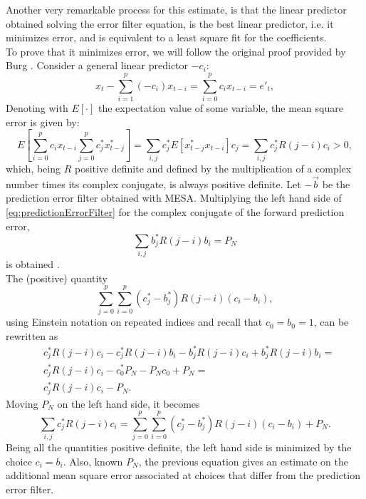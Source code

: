 \documentclass[twocolumn,showpacs,preprintnumbers,nofootinbib,prd,
superscriptaddress,10pt]{revtex4-1}
\begin{document}
Another very remarkable process for this estimate, is that the linear predictor obtained solving the error filter equation, is the best linear predictor, i.e. it minimizes error, and is equivalent to a least square fit for the coefficients. \cite{VDBos}  \\ 
To prove that it minimizes error, we will follow the original proof provided by Burg \cite{burg1975maximum}. Consider a general linear predictor $-c_i$: 
\begin{equation}
    x_{t} - \sum_{i = 1}^p (-c_i)x_{t - i} = \sum_{i = 0}^p c_i x_{t - i} = e'_t, 
\end{equation}
Denoting with $E\left[\cdot\right]$ the expectation value of some variable, the mean square error is given by: 
\begin{equation}
E\left[\sum_{i = 0}^p c_i x_{t-i}\sum_{j = 0}^p c^*_j x^*_{t - j}\right] = \sum_{i,j} c^*_j E\left[x^*_{t-j}x_{t-i} \right] c_j = \sum_{i, j}c^*_j R(j - i) c_i > 0,
\end{equation}
which, being $R$ positive definite and defined by the multiplication of a complex number times its complex conjugate, is always positive definite. 
Let $-\vec{b}$ be the prediction error filter obtained with MESA. Multiplying the left hand side of \ref{eq:predictionErrorFilter} for the complex conjugate of the forward prediction error, 
\begin{equation}\nonumber 
    \sum_{i,j}b^*_jR(j-i)b_i = P_N
\end{equation}
is obtained . \\ 
The (positive) quantity  
\begin{equation}\label{eq:linearPredictor}
    \sum_{j = 0}^p\sum_{i = 0}^p(c^*_j - b^*_j)R(j-i)(c_i - b_i),
\end{equation}
using Einstein notation on repeated indices and recall that $c_0 = b_0 = 1$, can be rewritten as 
\begin{align}
    & c^*_j R(j - i) c_i - c^*_j R(j - i) b_i - b^*_j R(j - i) c_i + b^*_j R(j - i)  b_i =\\ \nonumber 
    &c^*_j R(j - i) c_i - c^*_0 P_N - P_N c_0 + P_N =\\ \nonumber
    & c^*_j R(j - i) c_i - P_N.
\end{align}
Moving $P_N$ on the left hand side, it becomes 
\begin{equation}\label{eq:bestLinearPredictor}
    \sum_{i, j}c^*_j R(j-i)c_i = \sum_{j = 0}^p\sum_{i = 0}^p(c^*_j - b^*_j)R(j-i)(c_i - b_i) + P_N.
\end{equation}
Being all the quantities positive definite, the left hand side is minimized by the choice $c_i = b_i$. Also, known $P_N$, the previous equation gives an estimate on the additional mean square error associated at choices that differ from the prediction error filter. 
\end{document}
